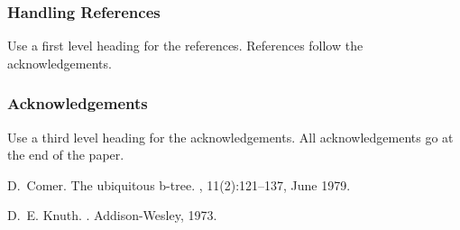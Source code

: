 \documentclass[a4paper]{article}
\begin{document}
\subsubsection{Handling References}

Use a first level heading for the references. References follow the
acknowledgements.


\subsubsection{Acknowledgements}

Use a third level heading for the acknowledgements. All acknowledgements
go at the end of the paper.




% 
%

\begin{thebibliography}{Com79}

D.~Comer.
\newblock The ubiquitous b-tree.
, 11(2):121--137, June 1979.

D.~E. Knuth.
.
\newblock Addison-Wesley, 1973.

\end{thebibliography}
\end{document}
